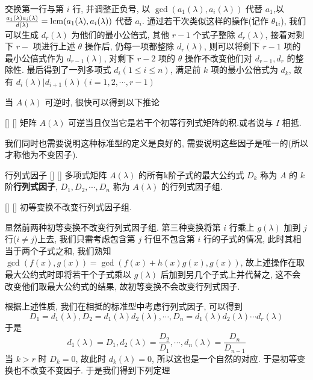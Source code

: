\documentclass[UTF8]{ctexart}
\DeclareMathOperator{\0}{\mathbf{0}}
\DeclareMathOperator{\<}{\langle}
\renewcommand{\>}{\rangle}
\begin{document}
\begin{prf}
            交换第一行与第 \(i\) 行, 并调整正负号, 以 \(\gcd(a_1(\lambda),a_i(\lambda))\) 代替 \(a_1\),以 \(\frac{a_1(\lambda)a_i(\lambda)}{d(\lambda)}=\operatorname{lcm}(a_1(\lambda),a_i(\lambda))\) 代替 \(a_i\).
            通过若干次类似这样的操作(记作 \(\theta_{1i}\)), 我们可以生成 \(d_r(\lambda)\) 为他们的最小公倍式, 其他 \(r-1\) 个式子整除 \(d_r(\lambda)\), 接着对剩下 \(r-\) 项进行上述 \(\theta\) 操作后, 仍每一项都整除 \(d_r(\lambda)\), 则可以将剩下 \(r-1\) 项的最小公倍式作为 \(d_{r-1}(\lambda)\), 对剩下 \(r-2\) 项的 \(\theta\) 操作不改变他们对 \(d_{r-1},d_r\) 的整除性. 最后得到了一列多项式 \(d_i(1\leq i\leq n)\), 满足前 \(k\) 项的最小公倍式为 \(d_k\), 故有 \(d_{i}(\lambda)|d_{i+1}(\lambda)(i=1,2,\cdots,r-1)\) 
        \end{prf}
        当 \(A(\lambda)\) 可逆时, 很快可以得到以下推论
        \begin{crl}
			[]
			{}
			[]
			[]
            矩阵 \(A(\lambda)\) 可逆当且仅当它是若干个初等行列式矩阵的积.或者说与 \(I\) 相抵.
        \end{crl}
        我们同时也需要说明这种标准型的定义是良好的, 需要说明这些因子是唯一的(所以才称他为不变因子).
        \begin{dfn}
			[]
			{行列式因子}
			[]
			[]
            多项式矩阵 \(A(\lambda)\) 的所有k阶子式的最大公约式 \(D_k\) 称为 \(A\) 的 \(k\) 阶\textbf{行列式因子},  \(D_1,D_2,\cdots,D_n\) 称为 \(A(\lambda)\) 的行列式因子组.
        \end{dfn}
        \begin{ppt}
			[]
			{}
			[]
			[]
            初等变换不改变行列式因子组.
        \end{ppt}
        \begin{prf}
            显然前两种初等变换不改变行列式因子组. 第三种变换将第 \(i\) 行乘上 \(g(\lambda)\) 加到 \(j\) 行(\(i\neq j\))上去, 
            我们只需考虑包含第 \(j\) 行但不包含第 \(i\) 行的子式的情况, 此时其相当于两个子式之和, 我们熟知 \(\gcd(f(x),g(x))=\gcd(f(x)+h(x)g(x),g(x))\), 故上述操作在取最大公约式时即将若干个子式乘以 \(g(\lambda)\) 后加到另几个子式上并代替之, 这不会改变他们取最大公约式的结果, 故初等变换不会改变行列式因子.
            
        \end{prf}
        根据上述性质, 我们在相抵的标准型中考虑行列式因子, 可以得到\[
        D_1=d_1(\lambda),D_2=d_1(\lambda)d_2(\lambda),\cdots,D_n=d_1(\lambda)d_2(\lambda)\cdots d_r(\lambda)
        \]
        于是\[
        d_1(\lambda)=D_1, d_2(\lambda)=\frac{D_2}{D_1},\cdots,d_n(\lambda)=\frac{D_n}{D_{n-1}}
        \]
        当 \(k>r\) 时 \(D_k=0\), 故此时 \(d_k(\lambda)=0\), 所以这也是一个自然的对应. 于是初等变换也不改变不变因子. 于是我们得到下列定理
\end{document}
